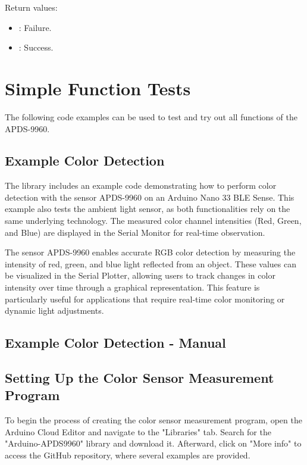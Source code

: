 \begin{itemize}
	\medskip
	
	Return values:
	
	\begin{itemize}
		\item {}: Failure.
		\item {}: Success.
	\end{itemize}
\end{itemize}




\section{Simple Function Tests}

The following code examples can be used to test and try out all functions of the APDS-9960.

\subsection{Example Color Detection}

The library   includes an example code demonstrating how to perform color detection with the sensor APDS-9960 on an Arduino Nano 33 BLE Sense. This example also tests the ambient light sensor, as both functionalities rely on the same underlying technology. The measured color channel intensities (Red, Green, and Blue) are displayed in the Serial Monitor for real-time observation.

The sensor APDS-9960 enables accurate RGB color detection by measuring the intensity of red, green, and blue light reflected from an object. These values can be visualized in the Serial Plotter, allowing users to track changes in color intensity over time through a graphical representation. This feature is particularly useful for applications that require real-time color monitoring or dynamic light adjustments.


\subsection{Example Color Detection - Manual}



\subsection{Setting Up the Color Sensor Measurement Program}

To begin the process of creating the color sensor measurement program, open the Arduino Cloud Editor and navigate to the "Libraries" tab. Search for the "Arduino-APDS9960" library and download it. Afterward, click on "More info" to access the GitHub repository, where several examples are provided.

